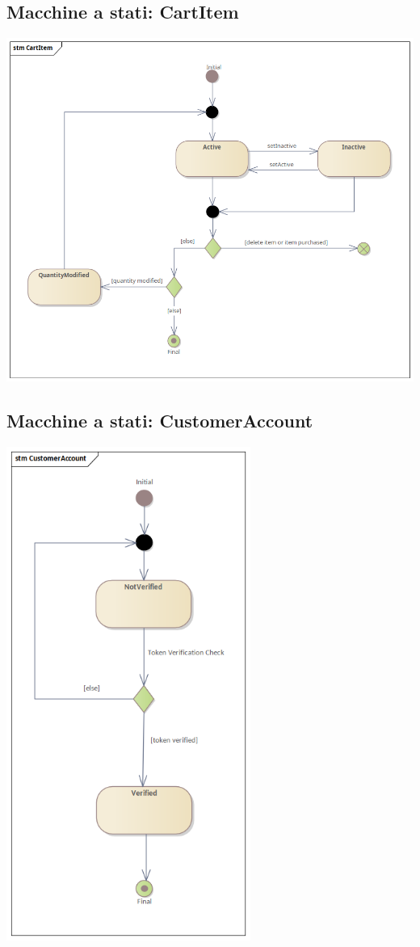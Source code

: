 \subsection{Macchine a stati: CartItem}
\begin{center}
  \includegraphics[width=\textwidth]{immagini/Progettazione/MachineStateDiagrams/CartItem.png}
\end{center}

\subsection{Macchine a stati: CustomerAccount}
\begin{center}
  \includegraphics[width=0.6\textwidth]{immagini/Progettazione/MachineStateDiagrams/CustomerAccount.png}
\end{center}

